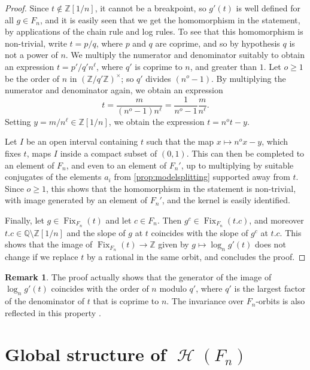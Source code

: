 \documentclass[reqno,12pt]{amsart}\setcounter{tocdepth}{1}
\theoremstyle{definition}
\newtheorem{remark}[theorem]{Remark}
\newcommand{\Z}{\mathbb{Z}}
\newcommand{\Q}{\mathbb{Q}}
\DeclareMathOperator{\Fix}{Fix}
\DeclareMathOperator{\Hyp}{\mathcal{H}}
\numberwithin{equation}{section}
\begin{document}
\begin{proof}
Since $t \notin \Z[1/n]$, it cannot be a breakpoint, so $g'(t)$ is well defined for all $g \in F_n$, and it is easily seen that we get the homomorphism in the statement, by applications of the chain rule and log rules.
To see that this homomorphism is non-trivial, write $t = p/q$, where $p$ and $q$ are coprime, and so by hypothesis $q$ is not a power of $n$. We multiply the numerator and denominator suitably to obtain an expression $t = p'/q' n^\ell$, where $q'$ is coprime to $n$, and greater than $1$. Let $o\ge 1$ be the order of $n$ in $(\Z/q'\Z)^\times$; so $q'$ divides $(n^o - 1)$. By multiplying the numerator and denominator again, we obtain an expression
\[
t = \frac{m}{(n^o - 1) n^\ell} = \frac{1}{n^o-1} \frac{m}{n^\ell}\text{.}
\]
Setting $y = m/n^\ell \in \Z[1/n]$, we obtain the expression $t = n^o t - y$.

Let $I$ be an open interval containing $t$ such that the map $x \mapsto n^o x - y$, which fixes $t$, maps $I$ inside a compact subset of $(0, 1)$. This can then be completed to an element of $F_n$, and even to an element of $F_n'$, up to multiplying by suitable conjugates of the elements $a_i$ from \cref{prop:modelsplitting} supported away from $t$. Since $o \ge 1$, this shows that the homomorphism in the statement is non-trivial, with image generated by an element of $F_n'$, and the kernel is easily identified.

Finally, let $g \in \Fix_{F_n}(t)$ and let $c \in F_n$. Then $g^c \in \Fix_{F_n}(t.c)$, and moreover $t.c \in \Q \setminus \Z[1/n]$ and the slope of $g$ at $t$ coincides with the slope of $g^c$ at $t.c$. This shows that the image of $\Fix_{F_n}(t) \to \Z$ given by $g \mapsto \log_n g'(t)$ does not change if we replace $t$ by a rational in the same orbit, and concludes the proof.
\end{proof}

\begin{remark}
The proof actually shows that the generator of the image of $\log_n g'(t)$ coincides with the order of $n$ modulo $q'$, where $q'$ is the largest factor of the denominator of $t$ that is coprime to $n$. The invariance over $F_n$-orbits is also reflected in this property \cite{hydelodha}.
\end{remark}



\section{Global structure of $\Hyp(F_n)$}\label{sec:global}
\end{document}
